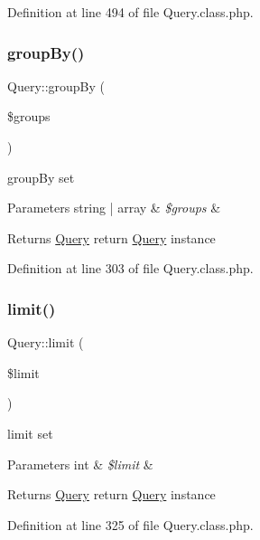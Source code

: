 Definition at line 494 of file Query.\+class.\+php.

\mbox{\label{classQuery_afeca4abb4534e8aa58db00dac98e7082}} 
\subsubsection{\texorpdfstring{group\+By()}{groupBy()}}
{\footnotesize\ttfamily Query\+::group\+By (\begin{DoxyParamCaption}\item[{}]{\$groups }\end{DoxyParamCaption})}

group\+By set 
\begin{DoxyParams}[1]{Parameters}
string | array & {\em \$groups} & \\
\hline
\end{DoxyParams}
\begin{DoxyReturn}{Returns}
\hyperlink{classQuery}{Query} return \hyperlink{classQuery}{Query} instance 
\end{DoxyReturn}


Definition at line 303 of file Query.\+class.\+php.

\mbox{\label{classQuery_af2e290d02d3e8c157f9b85b9da1ac08c}} 
\subsubsection{\texorpdfstring{limit()}{limit()}}
{\footnotesize\ttfamily Query\+::limit (\begin{DoxyParamCaption}\item[{}]{\$limit }\end{DoxyParamCaption})}

limit set 
\begin{DoxyParams}[1]{Parameters}
int & {\em \$limit} & \\
\hline
\end{DoxyParams}
\begin{DoxyReturn}{Returns}
\hyperlink{classQuery}{Query} return \hyperlink{classQuery}{Query} instance 
\end{DoxyReturn}


Definition at line 325 of file Query.\+class.\+php.

\mbox{\label{classQuery_a47d03784bf5f79d270e0f56f9ada6560}} 
